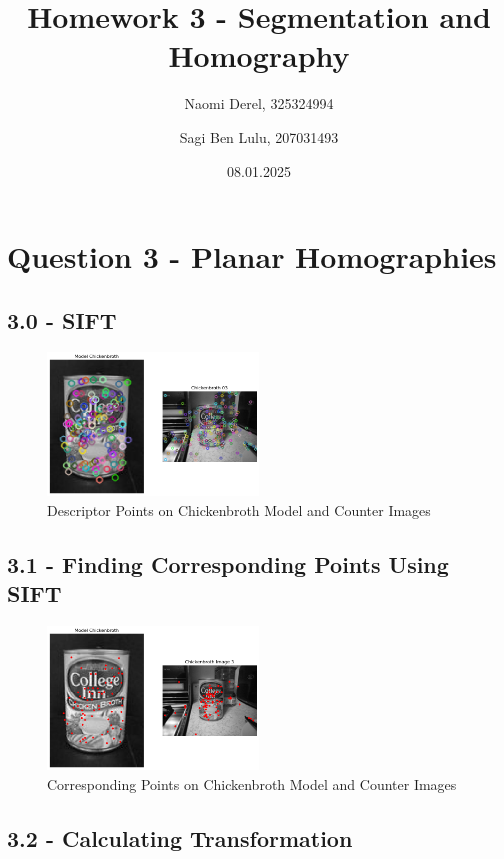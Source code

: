 \documentclass{article}
\title{Homework 3 - Segmentation and Homography}
\author{Naomi Derel, 325324994 
\and Sagi Ben Lulu, 207031493}
\date{08.01.2025}
\begin{document}
\maketitle

\section*{Question 3 - Planar Homographies}

\subsection*{3.0 - SIFT}

\begin{figure}[h!]
    \centering
    \includegraphics[width=0.5\textwidth]{../output/3.0_sift.png}
    \caption{Descriptor Points on Chickenbroth Model and Counter Images}
    \label{fig:3_1}
\end{figure}

\subsection*{3.1 - Finding Corresponding Points Using SIFT}

\begin{figure}[h!]
    \centering
    \includegraphics[width=0.5\textwidth]{../output/3.1_cb.png}
    \caption{Corresponding Points on Chickenbroth Model and Counter Images}
    \label{fig:3_1}
\end{figure}

\subsection*{3.2 - Calculating Transformation}
\end{document}

